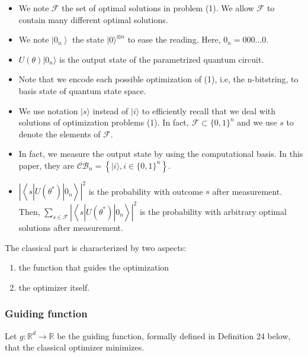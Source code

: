 \begin{remark}
    \begin{itemize}
        \item We note $\mathcal{F}$ the set of optimal solutions in problem (1). We allow $\mathcal{F}$ to contain many different optimal solutions.
        \item  We note $\left|0_{n}\right\rangle$ the state $|0\rangle^{\otimes n}$ to ease the reading. Here, $0_{n}=000\dots0.$
        \item $U\left(\theta\right)| 0_{n}\rangle$ is the output state of the parametrized quantum circuit. 
        \item Note that we encode each possible optimization of (1), i.e, the n-bitstring, to basis state of quantum state space.
        \item We use notation $|s\rangle$ instead of $|i\rangle$ to efficiently recall that we deal with solutions of optimization problems (1). In fact, $\mathcal{F} \subset \{0,1\}^{n}$ and we use $s$ to denote the elements of $\mathcal{F}.$
        \item   In fact, we measure the output state by using the computational basis. In this paper, they are $\mathcal{C B}_{n}=\left\{|i\rangle, i \in\{0,1\}^{n}\right\}$.
        \item $\left|\left\langle s\left|U\left(\theta^*\right)\right| 0_n\right\rangle\right|^2$ is the probability with outcome $s$ after measurement. Then, $\sum_{s \in \mathcal{F}}\left|\left\langle s\left|U\left(\theta^{*}\right)\right| 0_{n}\right\rangle\right|^{2}$ is the probability with arbitrary optimal solutions after measurement.
    \end{itemize}
\end{remark}

The classical part is characterized by two aspects: 
\begin{enumerate}
    \item the function that guides the optimization
    \item the optimizer itself.
\end{enumerate}

\subsubsection{Guiding function}

Let $g: \mathbb{R}^{d} \rightarrow \mathbb{R}$ be the guiding function, formally defined in Definition 24 below, that the classical optimizer minimizes. 

